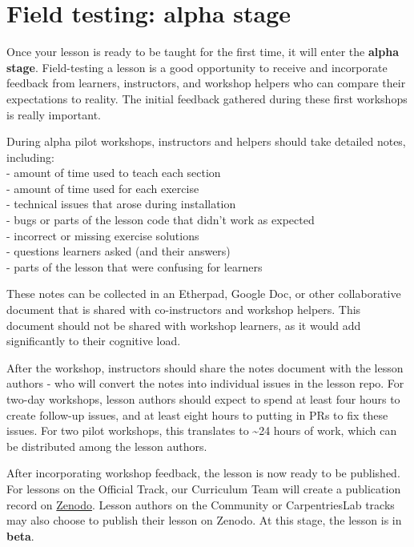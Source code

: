 \documentclass[]{book}
\begin{document}
\hypertarget{field-testing-alpha-stage}{%
\section{Field testing: alpha stage}\label{field-testing-alpha-stage}}

Once your lesson is ready to be taught for the first
time, it will enter the \textbf{alpha stage}. Field-testing a
lesson is a good opportunity to receive and incorporate
feedback from learners, instructors, and workshop
helpers who can compare their expectations to
reality. The initial feedback gathered during these first
workshops is really important.

During alpha pilot workshops, instructors and helpers should take detailed notes, including:\\
- amount of time used to teach each section\\
- amount of time used for each exercise\\
- technical issues that arose during installation\\
- bugs or parts of the lesson code that didn't work as expected\\
- incorrect or missing exercise solutions\\
- questions learners asked (and their answers)\\
- parts of the lesson that were confusing for learners

These notes can be collected in an Etherpad, Google Doc, or other collaborative document that is shared
with co-instructors and workshop helpers. This document should not be shared with workshop learners,
as it would add significantly to their cognitive load.

After the workshop, instructors should share the notes document with the lesson authors - who
will convert the notes into individual issues in the lesson repo. For two-day workshops, lesson authors should expect
to spend at least four hours to create follow-up issues, and at least
eight hours to putting in PRs to fix these issues. For two pilot workshops, this translates
to \textasciitilde{}24 hours of work, which can be distributed among the lesson authors.

After incorporating workshop feedback, the lesson is
now ready to be published. For lessons on the Official
Track, our Curriculum Team will create a publication
record on \href{https://zenodo.org/communities/carpentries/?page=1\&size=20}{Zenodo}. Lesson authors on the Community or CarpentriesLab tracks
may also choose to publish their lesson on Zenodo. At this stage, the lesson is in \textbf{beta}.
\end{document}
